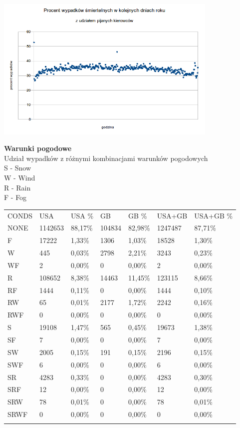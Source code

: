 \includegraphics[width=0.8\textwidth]{images/hipotheses/drunk_drivers/day_of_year.png}

\textbf{Warunki pogodowe}\\Udział wypadków z różnymi kombinacjami
warunków pogodowych\\S - Snow\\W - Wind\\R - Rain\\F - Fog

\begin{longtable}[c]{@{}lllllll@{}}
\toprule\addlinespace
CONDS & USA & USA \% & GB & GB \% & USA+GB & USA+GB \%
\\\addlinespace
\midrule\endhead
NONE & 1142653 & 88,17\% & 104834 & 82,98\% & 1247487 & 87,71\%
\\\addlinespace
F & 17222 & 1,33\% & 1306 & 1,03\% & 18528 & 1,30\%
\\\addlinespace
W & 445 & 0,03\% & 2798 & 2,21\% & 3243 & 0,23\%
\\\addlinespace
WF & 2 & 0,00\% & 0 & 0,00\% & 2 & 0,00\%
\\\addlinespace
R & 108652 & 8,38\% & 14463 & 11,45\% & 123115 & 8,66\%
\\\addlinespace
RF & 1444 & 0,11\% & 0 & 0,00\% & 1444 & 0,10\%
\\\addlinespace
RW & 65 & 0,01\% & 2177 & 1,72\% & 2242 & 0,16\%
\\\addlinespace
RWF & 0 & 0,00\% & 0 & 0,00\% & 0 & 0,00\%
\\\addlinespace
S & 19108 & 1,47\% & 565 & 0,45\% & 19673 & 1,38\%
\\\addlinespace
SF & 7 & 0,00\% & 0 & 0,00\% & 7 & 0,00\%
\\\addlinespace
SW & 2005 & 0,15\% & 191 & 0,15\% & 2196 & 0,15\%
\\\addlinespace
SWF & 6 & 0,00\% & 0 & 0,00\% & 6 & 0,00\%
\\\addlinespace
SR & 4283 & 0,33\% & 0 & 0,00\% & 4283 & 0,30\%
\\\addlinespace
SRF & 12 & 0,00\% & 0 & 0,00\% & 12 & 0,00\%
\\\addlinespace
SRW & 78 & 0,01\% & 0 & 0,00\% & 78 & 0,01\%
\\\addlinespace
SRWF & 0 & 0,00\% & 0 & 0,00\% & 0 & 0,00\%
\\\addlinespace
\bottomrule
\end{longtable}

